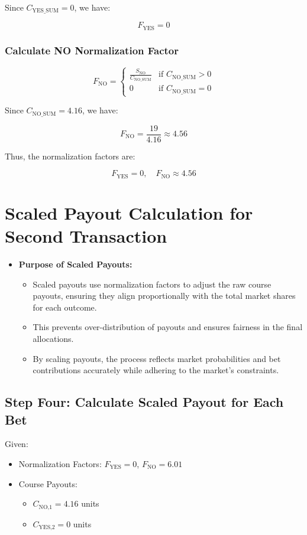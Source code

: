 \documentclass{article}
\begin{document}
Since \( C_{\text{YES\_SUM}} = 0 \), we have:

\[
F_{\text{YES}} = 0
\]

\subsubsection*{Calculate NO Normalization Factor}

\[
F_{\text{NO}} =
\begin{cases}
      \frac{S_{\text{NO}}}{C_{\text{NO\_SUM}}} & \text{if } C_{\text{NO\_SUM}} > 0 \\
      0 & \text{if } C_{\text{NO\_SUM}} = 0
   \end{cases}
\]

Since \( C_{\text{NO\_SUM}} = 4.16 \), we have:

\[
F_{\text{NO}} = \frac{19}{4.16} \approx 4.56
\]

Thus, the normalization factors are:

\[
F_{\text{YES}} = 0, \quad F_{\text{NO}} \approx 4.56
\]

\newpage


\section*{Scaled Payout Calculation for Second Transaction}

\begin{itemize}
    \item \textbf{Purpose of Scaled Payouts:}
    \begin{itemize}
        \item Scaled payouts use normalization factors to adjust the raw course payouts, ensuring they align proportionally with the total market shares for each outcome.
        \item This prevents over-distribution of payouts and ensures fairness in the final allocations.
        \item By scaling payouts, the process reflects market probabilities and bet contributions accurately while adhering to the market's constraints.
    \end{itemize}
\end{itemize}

\subsection*{Step Four: Calculate Scaled Payout for Each Bet}

Given:
\begin{itemize}
    \item Normalization Factors: \( F_{\text{YES}} = 0 \), \( F_{\text{NO}} = 6.01 \)
    \item Course Payouts:
    \begin{itemize}
        \item \( C_{\text{NO,1}} = 4.16 \) units
        \item \( C_{\text{YES,2}} = 0 \) units
    \end{itemize}
\end{itemize}
\end{document}
